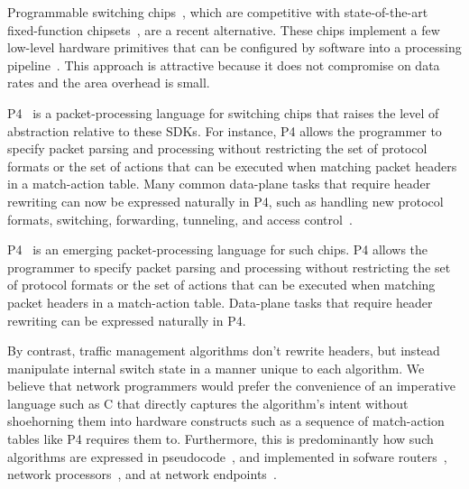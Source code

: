 Programmable switching chips~\cite{flexpipe, xpliant, rmt}, which are
competitive with state-of-the-art fixed-function
chipsets~\cite{trident, tomahawk, mellanox}, are a recent alternative.
These chips implement a few low-level hardware primitives that can be
configured by software into a processing
pipeline~\cite{xpliant_sdk,xpliant_sdk2,intel_sdk,rmt,p4}. This
approach is attractive because it does not compromise on data rates
and the area overhead is small.


P4~\cite{p4, p4spec} is a packet-processing language for switching chips that
raises the level of abstraction relative to these SDKs.  For instance, P4
allows the programmer to specify packet parsing and processing without
restricting the set of protocol formats or the set of actions that can be
executed when matching packet headers in a match-action table. Many common
data-plane tasks that require header rewriting can now be expressed
naturally in P4, such as handling new protocol formats, switching, forwarding,
tunneling, and access control~\cite{dc_p4}.
\fi

P4~\cite{p4, p4spec} is an emerging packet-processing language for
such chips. P4 allows the programmer to specify packet parsing and
processing without restricting the set of protocol formats or the set
of actions that can be executed when matching packet headers in a
match-action table. Data-plane tasks that require header rewriting can
be expressed naturally in P4.

By contrast, traffic management algorithms don't rewrite headers, but
instead manipulate internal switch state in a manner unique to each
algorithm. We believe that network programmers would prefer the
convenience of an imperative language such as C that directly captures
the algorithm's intent without shoehorning them into hardware
constructs such as a sequence of match-action tables like P4 requires
them to.  Furthermore, this is predominantly how such algorithms are
expressed in pseudocode~\cite{red, csfq, codel_code, avq, blue}, and
implemented in sofware routers~\cite{click, dpdk, routebricks},
network processors~\cite{packetc, nova}, and at network
endpoints~\cite{qdisc}.

